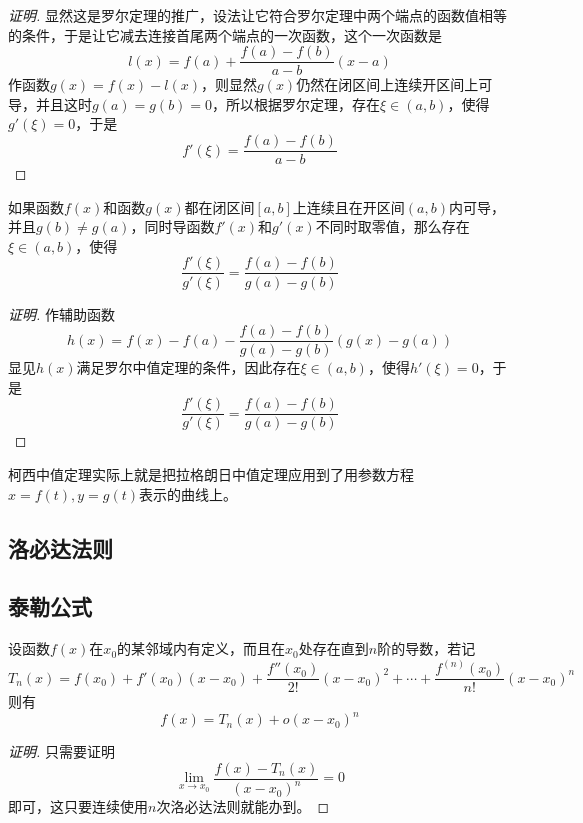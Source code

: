 \begin{proof}[证明]
  显然这是罗尔定理的推广，设法让它符合罗尔定理中两个端点的函数值相等的条件，于是让它减去连接首尾两个端点的一次函数，这个一次函数是
  \[ l(x) = f(a) + \frac{f(a)-f(b)}{a-b}(x-a) \]
  作函数$g(x)=f(x)-l(x)$，则显然$g(x)$仍然在闭区间上连续开区间上可导，并且这时$g(a)=g(b)=0$，所以根据罗尔定理，存在$\xi \in (a,b)$，使得$g'(\xi)=0$，于是
  \[ f'(\xi) = \frac{f(a)-f(b)}{a-b} \]
\end{proof}

\begin{theorem}
  如果函数$f(x)$和函数$g(x)$都在闭区间$[a,b]$上连续且在开区间$(a,b)$内可导，并且$g(b) \neq g(a)$，同时导函数$f'(x)$和$g'(x)$不同时取零值，那么存在$\xi \in (a,b)$，使得
  \[ \frac{f'(\xi)}{g'(\xi)} = \frac{f(a)-f(b)}{g(a)-g(b)} \]
\end{theorem}

\begin{proof}[证明]
  作辅助函数
  \[ h(x) = f(x)-f(a)-\frac{f(a)-f(b)}{g(a)-g(b)}(g(x)-g(a)) \]
  显见$h(x)$满足罗尔中值定理的条件，因此存在$\xi \in (a,b)$，使得$h'(\xi)=0$，于是
  \[ \frac{f'(\xi)}{g'(\xi)} = \frac{f(a)-f(b)}{g(a)-g(b)} \]
\end{proof}

柯西中值定理实际上就是把拉格朗日中值定理应用到了用参数方程$x=f(t),y=g(t)$表示的曲线上。

\subsection{洛必达法则}
\label{sec:Hospital-limit-rule}

\subsection{泰勒公式}
\label{sec:taylor-theorem}

\begin{theorem}
  设函数$f(x)$在$x_0$的某邻域内有定义，而且在$x_0$处存在直到$n$阶的导数，若记
  \[ T_n(x) = f(x_0)+f'(x_0)(x-x_0)+\frac{f''(x_0)}{2!}(x-x_0)^2 + \cdots
    + \frac{f^{(n)}(x_0)}{n!}(x-x_0)^n \]
  则有
  \[ f(x) = T_n(x) + o(x-x_0)^n \]
\end{theorem}

\begin{proof}[证明]
  只需要证明
  \[ \lim_{x \to x_0} \frac{f(x) - T_n(x)}{(x-x_0)^n} = 0 \]
  即可，这只要连续使用$n$次洛必达法则就能办到。
\end{proof}

